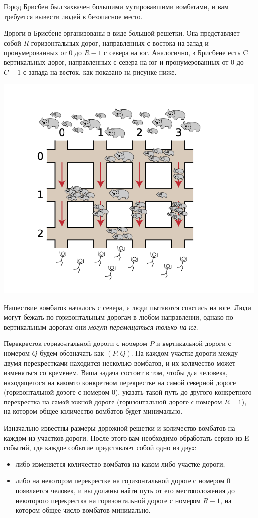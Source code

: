 Город Брисбен был захвачен большими мутировавшими вомбатами, и вам требуется вывести людей в безопасное место.

Дороги в Брисбене организованы в виде большой решетки. Она представляет собой $R$ горизонтальных дорог, направленных с востока на запад и пронумерованных от $0$ до $R - 1$ с севера на юг. Аналогично, в Брисбене есть C вертикальных дорог, направленных с севера на юг и пронумерованных от $0$ до $C - 1$ с запада на восток,
как показано на рисунке ниже.

\includegraphics{wombats1.png}

Нашествие вомбатов началось с севера, и люди пытаются спастись на юге. Люди могут бежать по горизонтальным дорогам в любом направлении, однако по вертикальным дорогам они \textit{могут перемещаться только на юг}.

Перекресток горизонтальной дороги с номером $P$ и вертикальной дороги с номером $Q$ будем обозначать как $(P, Q)$. На каждом участке дороги между двумя перекрестками находится несколько вомбатов, и их количество может изменяться со временем. Ваша задача состоит в том, чтобы для человека, находящегося на каком­то конкретном перекрестке на самой северной дороге (горизонтальной дороге с номером $0$), указать такой путь до другого конкретного перекрестка на самой южной дороге (горизонтальной дороге с номером $R - 1$), на котором общее количество вомбатов будет минимально.

Изначально известны размеры дорожной решетки и количество вомбатов на каждом из участков дороги. После этого вам необходимо обработать серию из E событий, где каждое событие представляет собой одно из двух:
\begin{itemize}
\item либо изменяется количество вомбатов на каком­-либо участке дороги;
\item либо на некотором перекрестке на горизонтальной дороге с номером $0$ появляется человек, и вы должны найти путь от его местоположения до некоторого перекрестка на горизонтальной дороге с номером $R - 1$, на котором общее число вомбатов минимально.
\end{itemize}


